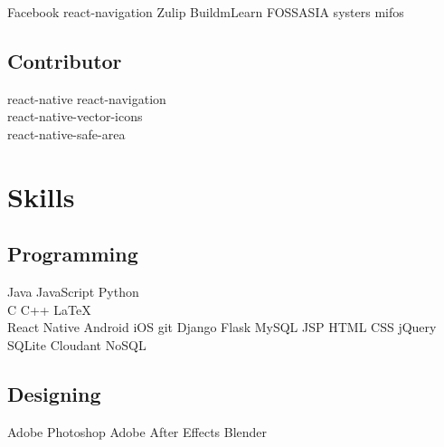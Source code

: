 \documentclass[a4paper]{deedy-resume} %
\begin{document}
\begin{minipage}[t]{0.33\textwidth}
    Facebook \textbullet{} react-navigation \textbullet{} Zulip \textbullet{} BuildmLearn  \textbullet{} FOSSASIA \textbullet{}
    systers \textbullet{} mifos \\
    
    \sectionspace %
    
    \subsection{Contributor}
    
    \textbullet{} react-native 
    \textbullet{} react-navigation \\
    \textbullet{} react-native-vector-icons \\
    \textbullet{} react-native-safe-area 
    
    \sectionspace %
    
    
    \section{Skills}
    
    \subsection{Programming}
    
    Java \textbullet{} JavaScript \textbullet{} Python\\
    C \textbullet{} C++ \textbullet{} \LaTeX\ \\ 
    React Native \textbullet{} Android \textbullet{} iOS \textbullet{} git \textbullet{} Django \textbullet{} Flask \textbullet{} MySQL \textbullet{} JSP \textbullet{} HTML \textbullet{} CSS \textbullet{} jQuery \textbullet{} SQLite \textbullet{} Cloudant NoSQL
    
    \sectionspace %
    
    \subsection{Designing}
    Adobe Photoshop \textbullet{} Adobe After Effects \textbullet{} Blender
    
    \sectionspace %
    

\end{minipage}
\end{document}
